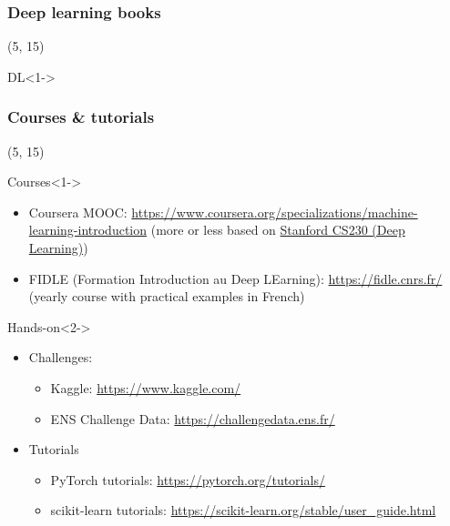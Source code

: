 \begin{frame}
  \frametitle{Deep learning books}

  \nocite{*}

  \begin{textblock}{90}(5, 15)
    \begin{block}{DL}<1->
      \printbibliography[heading=none,category=deep_learning]
    \end{block}
  \end{textblock}
\end{frame}

\begin{frame}
  \frametitle{Courses \& tutorials}

  \begin{textblock}{90}(5, 15)
    \begin{block}{Courses}<1->
      \begin{itemize}
      \item Coursera MOOC:
        \url{https://www.coursera.org/specializations/machine-learning-introduction} (more or less based on \href{https://cs230.stanford.edu/}{Stanford CS230 (Deep Learning)})
      \item FIDLE (Formation Introduction au Deep LEarning): \url{https://fidle.cnrs.fr/}
        (yearly course with practical examples in French)
      \end{itemize}
    \end{block}

    \begin{block}{Hands-on}<2->
      \begin{itemize}
      \item Challenges:
        \begin{itemize}
        \item Kaggle: \url{https://www.kaggle.com/}
        \item ENS Challenge Data: \url{https://challengedata.ens.fr/}
        \end{itemize}
      \item Tutorials
        \begin{itemize}
        \item PyTorch tutorials: \url{https://pytorch.org/tutorials/}
        \item scikit-learn tutorials:
          \url{https://scikit-learn.org/stable/user_guide.html}
        \end{itemize}
      \end{itemize}
    \end{block}
  \end{textblock}
\end{frame}
